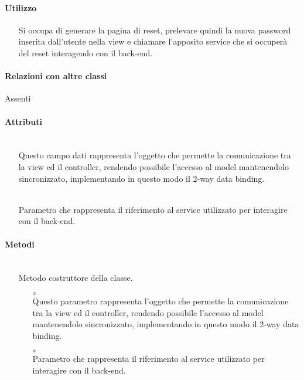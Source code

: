 \paragraph*{Utilizzo}
\begin{itemize}
\item[] Si occupa di generare la pagina di reset, prelevare quindi la nuova password inserita dall'utente nella view e chiamare l'apposito service che si occuperà del reset interagendo con il back-end.
\end{itemize}

\paragraph*{Relazioni con altre classi}
Assenti

\paragraph*{Attributi}
\begin{itemize}
\item[]  \\ Questo campo dati rappresenta l'oggetto che permette la comunicazione tra la view ed il controller, rendendo possibile l’accesso al model mantenendolo sincronizzato, implementando in questo modo il 2-way data binding.
\item[]  \\ Parametro che rappresenta il riferimento al service utilizzato per interagire con il back-end.
\end{itemize}

\paragraph*{Metodi}
\begin{itemize}
\item[]  \\ Metodo costruttore della classe.
\begin{itemize}\addtolength{\itemsep}{-0.5\baselineskip}
\item[$\circ$]  \\ Questo parametro rappresenta l'oggetto che permette la comunicazione tra la view ed il controller, rendendo possibile l’accesso al model mantenendolo sincronizzato, implementando in questo modo il 2-way data binding.
\item[$\circ$]  \\ Parametro che rappresenta il riferimento al service utilizzato per interagire con il back-end.
\end{itemize}
\end{itemize}

